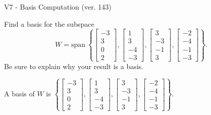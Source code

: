 \begin{exercise}
  \begin{exerciseTitle}V7 - Basis Computation (ver. 143)\end{exerciseTitle}
  \begin{exerciseStatement}
    Find a basis for the subspace 
\[W=\mathrm{span}\ \left\{\left[\begin{array}{r}
-3 \\
3 \\
0 \\
2
\end{array}\right] , \left[\begin{array}{r}
1 \\
3 \\
-4 \\
-3
\end{array}\right] , \left[\begin{array}{r}
3 \\
-3 \\
-1 \\
3
\end{array}\right] , \left[\begin{array}{r}
-2 \\
-4 \\
-1 \\
-3
\end{array}\right]\right\}.\]
 Be sure to explain why your result is a basis.


  \end{exerciseStatement}
  \begin{exerciseAnswer}
   A basis of \(W\) is  \(\left\{\left[\begin{array}{r}
-3 \\
3 \\
0 \\
2
\end{array}\right] , \left[\begin{array}{r}
1 \\
3 \\
-4 \\
-3
\end{array}\right] , \left[\begin{array}{r}
3 \\
-3 \\
-1 \\
3
\end{array}\right] , \left[\begin{array}{r}
-2 \\
-4 \\
-1 \\
-3
\end{array}\right]\right\}\).
  


  \end{exerciseAnswer}
\end{exercise}